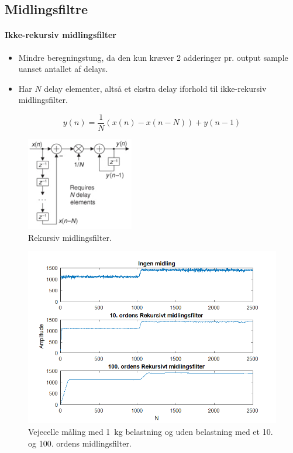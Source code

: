 \documentclass[danish]{article}
\begin{document}
\subsection{Midlingsfiltre}
\paragraph{Ikke-rekursiv midlingsfilter}
\begin{itemize}
	\item Mindre beregningstung, da den kun kræver 2 adderinger pr. output sample uanset antallet af delays.
	\item Har $N$ delay elementer, altså et ekstra delay iforhold til ikke-rekursiv midlingsfilter. 
\end{itemize}

\begin{equation}
y(n)=\frac{1}{N}(x(n)-x(n-N))+y(n-1)
\end{equation}

\begin{figure} [H]
	\centering
	\includegraphics[width=0.3\linewidth]{graphics/recursic}
	\caption{Rekursiv midlingsfilter.}
	\label{fig:recursic}
\end{figure}

\begin{figure}[H]
	\centering
	\includegraphics[width=0.65\linewidth]{graphics/case3_3}
	\caption{Vejecelle måling med \SI{1}{\kilogram} belastning og  uden belastning med et 10. og 100. ordens midlingsfilter.}
	\label{fig:case3_3}
\end{figure}
\end{document}
